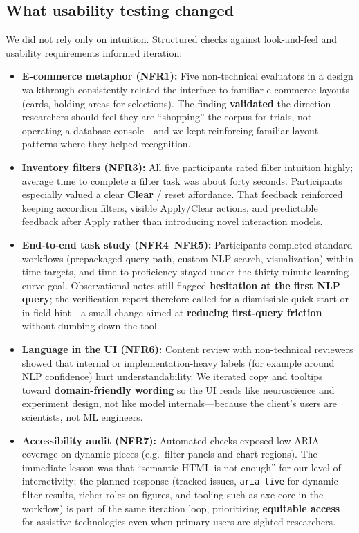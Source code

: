 \documentclass{article}
\begin{document}
\subsection{What usability testing changed}

\par{We did not rely only on intuition. Structured checks against look-and-feel and usability requirements informed iteration:}

\begin{itemize}
    \item \textbf{E-commerce metaphor (NFR1):} Five non-technical evaluators in a design walkthrough consistently related the interface to familiar e-commerce layouts (cards, holding areas for selections). The finding \textbf{validated} the direction---researchers should feel they are ``shopping'' the corpus for trials, not operating a database console---and we kept reinforcing familiar layout patterns where they helped recognition.
    \item \textbf{Inventory filters (NFR3):} All five participants rated filter intuition highly; average time to complete a filter task was about forty seconds. Participants especially valued a clear \textbf{Clear} / reset affordance. That feedback reinforced keeping accordion filters, visible Apply/Clear actions, and predictable feedback after Apply rather than introducing novel interaction models.
    \item \textbf{End-to-end task study (NFR4--NFR5):} Participants completed standard workflows (prepackaged query path, custom NLP search, visualization) within time targets, and time-to-proficiency stayed under the thirty-minute learning-curve goal. Observational notes still flagged \textbf{hesitation at the first NLP query}; the verification report therefore called for a dismissible quick-start or in-field hint---a small change aimed at \textbf{reducing first-query friction} without dumbing down the tool.
    \item \textbf{Language in the UI (NFR6):} Content review with non-technical reviewers showed that internal or implementation-heavy labels (for example around NLP confidence) hurt understandability. We iterated copy and tooltips toward \textbf{domain-friendly wording} so the UI reads like neuroscience and experiment design, not like model internals---because the client's users are scientists, not ML engineers.
    \item \textbf{Accessibility audit (NFR7):} Automated checks exposed low ARIA coverage on dynamic pieces (e.g.\ filter panels and chart regions). The immediate lesson was that ``semantic HTML is not enough'' for our level of interactivity; the planned response (tracked issues, \texttt{aria-live} for dynamic filter results, richer roles on figures, and tooling such as axe-core in the workflow) is part of the same iteration loop, prioritizing \textbf{equitable access} for assistive technologies even when primary users are sighted researchers.
\end{itemize}
\end{document}
